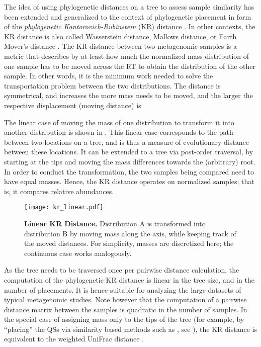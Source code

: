 The idea of using phylogenetic distances on a tree to assess sample similarity
has been extended and generalized to the context of phylogenetic placement
in form of the \emph{phylogenetic Kantorovich-Rubinstein} (KR) distance \cite{Matsen2011a,Evans2012}.
In other contexts, the KR distance is also called Wasserstein distance, Mallows distance, or Earth Mover's distance
\cite{Mallows1972,Rachev1985,Levina2001,Villani2008}.
The KR distance between two metagenomic samples is a metric that describes
by at least how much the normalized mass distribution of one sample has to be moved across the \ac{RT}
to obtain the distribution of the other sample.
In other words, it is the minimum work needed to solve the transportation problem between the two distributions.
The distance is symmetrical, and increases the more mass needs to be moved,
and the larger the respective displacement (moving distance) is.

The linear case of moving the mass of one distribution to transform it into another distribution
is shown in .
This linear case corresponds to the path between two locations on a tree,
and is thus a measure of evolutionary distance between these locations.
It can be extended to a tree via post-order traversal,
by starting at the tips and moving the mass differences towards the (arbitrary) root.
In order to conduct the transformation, the two samples being compared need to have equal masses.
Hence, the KR distance operates on normalized samples; that is, it compares relative abundances.

\begin{figure}[!htb]
    \centering
    \texttt{[image: kr\_linear.pdf]}
    \caption[Linear KR Distance]{
        \textbf{Linear KR Distance.}
        Distribution A is transformed into distribution B by moving mass along the axis,
        while keeping track of the moved distances.
        For simplicity, masses are discretized here; the continuous case works analogously.
    }
    \label{fig:kr_linear}
\end{figure}

As the tree needs to be traversed once per pairwise distance calculation,
the computation of the phylogenetic KR distance is linear in the tree size, and in the number of placements.
It is hence suitable for analyzing the large datasets of typical metagenomic studies.
Note however that the computation of a pairwise distance matrix between the samples is quadratic in the number of samples.
In the special case of assigning mass only to the tips of the tree
(for example, by ``placing'' the \acp{QS} via similarity based methods such as , see ),
the KR distance is equivalent to the weighted UniFrac distance \cite{Evans2012}.

